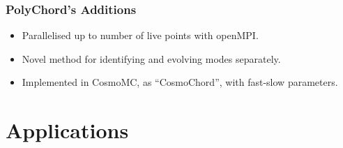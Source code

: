 \documentclass[]{beamer}
\begin{document}
\begin{frame}
  \frametitle{PolyChord's Additions}

  \begin{itemize}
    \item<2-> Parallelised up to number of live points with openMPI.
    \item<3-> Novel method for identifying and evolving modes separately.
    \item<4-> Implemented in CosmoMC, as ``CosmoChord'', with fast-slow parameters.
  \end{itemize}
\end{frame}






\section{Applications}
\end{document}
